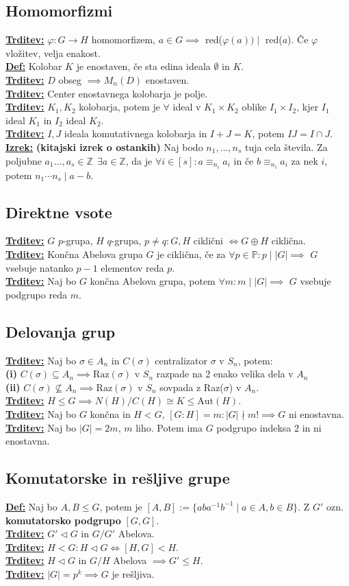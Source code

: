 \documentclass[a4paper,oneside,8pt,landscape]{extarticle}
\renewcommand{\phi}{\varphi}
\let\oldtextbf\textbf
\renewcommand{\textbf}[1]{\oldtextbf{\boldmath #1}}
\newcommand{\definicija}[1]{\textbf{\underline{Def:} }{#1}\\}
\newcommand{\trditev}[1]{\textbf{\underline{Trditev:} }{#1}\\}
\newcommand{\izrek}[1]{\textbf{\underline{Izrek:} }{#1}\\}
\newcommand{\bt}[1]{\textbf{#1}}
\begin{document}
\begin{multicols*}{3}
\subsection*{Homomorfizmi}
\trditev{$\phi:G\to H$ homomorfizem, $a\in G \implies $ red($\phi(a)) \mid $ red($a$). Če $\phi$ vložitev, velja enakost.}
\definicija{Kolobar $K$ je enostaven, če sta edina ideala $\emptyset$ in $K$.}
\trditev{$D$ obseg $\implies M_n(D)$ enostaven.}
\trditev{Center enostavnega kolobarja je polje.}
\trditev{$K_1,K_2$ kolobarja, potem je $\forall $ ideal v $K_1\times K_2$ oblike $I_1\times I_2$, kjer $I_1$ ideal $K_1$ in $I_2$ ideal $K_2$.}
\trditev{$I,J$ ideala komutativnega kolobarja in $I+J=K$, potem $IJ = I\cap J$.}
\izrek{\bt{(kitajski izrek o ostankih)} Naj bodo $n_1,\dots,n_s$ tuja cela števila. Za poljubne $a_1\dots,a_s\in \mathbb{Z} \ \  \exists a\in\mathbb{Z}$, da je $\forall i\in[s]:a\equiv_{n_i} a_i$ in če $b\equiv_{n_i} a_i$ za nek $i$, potem $n_1\cdots n_s \mid a-b$.}
\vspace{-15pt}
\subsection*{Direktne vsote}
\trditev{$G$ $p$-grupa, $H$ $q$-grupa, $p\neq q: G,H$ ciklični $\iff G\oplus H$ ciklična.}
\trditev{Končna Abelova grupa $G$ je ciklična, če za $\forall p\in \mathbb{P}: p\mid |G| \implies $ $G$ vsebuje natanko $p-1$ elementov reda $p$.}
\trditev{Naj bo $G$ končna Abelova grupa, potem $\forall m: m\mid |G|\implies $ $G$ vsebuje podgrupo reda $m$.}
\vspace{-15pt}
\subsection*{Delovanja grup}
\trditev{Naj bo $\sigma\in A_n$ in $C(\sigma)$ centralizator $\sigma$ v $S_n$, potem: \\
\bt{(i)} $C(\sigma)\subseteq A_n \implies \text{Raz}(\sigma)$ v $S_n$ razpade na 2 enako velika dela v $A_n$ \\
\bt{(ii)} $C(\sigma)\nsubseteq A_n \implies \text{Raz}(\sigma)$ v $S_n$ sovpada z Raz($\sigma$) v $A_n$.}
\trditev{$H\leq G \implies N(H)/C(H) \cong K \leq \text{Aut}(H)$.}
\trditev{Naj bo $G$ končna in $H<G$, $[G:H] = m: |G|\nmid m! \implies G$ ni enostavna.}
\trditev{Naj bo $|G| = 2m$, $m$ liho. Potem ima $G$ podgrupo indeksa 2 in ni enostavna.}
\vspace{-15pt}
\subsection*{Komutatorske in rešljive grupe}
\definicija{Naj bo $A,B\leq G$, potem je $[A,B] := \{aba^{-1}b^{-1} \mid a\in A, b\in B\}$. Z $G'$ ozn. \bt{komutatorsko podgrupo} $[G,G]$.}
\trditev{$G'\triangleleft G$ in $G/G'$ Abelova.}
\trditev{$H<G: H\triangleleft G \iff [H,G] < H$.}
\trditev{$H\triangleleft G$ in $G/H$ Abelova $\implies G'\leq H$.}
\trditev{$|G| = p^k \implies G$ je rešljiva.}
\vspace{-15pt}

\end{multicols*}
\end{document}
